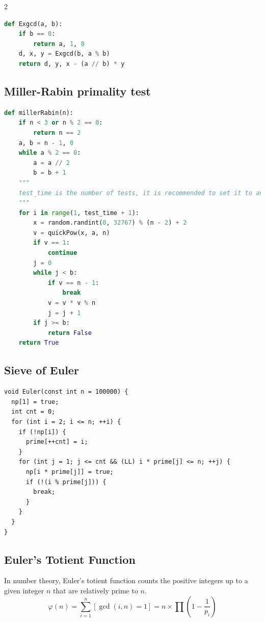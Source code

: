 \documentclass[9pt,landscape]{article}
\begin{document}
\begin{multicols}{2}
\begin{lstlisting}[language=python]
def Exgcd(a, b):
    if b == 0:
        return a, 1, 0
    d, x, y = Exgcd(b, a % b)
    return d, y, x - (a // b) * y
\end{lstlisting}

\subsection{Miller-Rabin primality test}

\begin{lstlisting}[language=python]
def millerRabin(n):
    if n < 3 or n % 2 == 0:
        return n == 2
    a, b = n - 1, 0
    while a % 2 == 0:
        a = a // 2
        b = b + 1
    """
    test_time is the number of tests, it is recommended to set it to an integer not less than 8 to ensure the correct rate, but it should not be too large, otherwise it will affect the efficiency
    """
    for i in range(1, test_time + 1):
        x = random.randint(0, 32767) % (n - 2) + 2
        v = quickPow(x, a, n)
        if v == 1:
            continue
        j = 0
        while j < b:
            if v == n - 1:
                break
            v = v * v % n
            j = j + 1
        if j >= b:
            return False
    return True
\end{lstlisting}

\subsection{Sieve of Euler}

\begin{lstlisting}
void Euler(const int n = 100000) {
  np[1] = true;
  int cnt = 0;
  for (int i = 2; i <= n; ++i) {
    if (!np[i]) {
      prime[++cnt] = i;
    }
    for (int j = 1; j <= cnt && (LL) i * prime[j] <= n; ++j) {
      np[i * prime[j]] = true;
      if (!(i % prime[j])) {
        break;
      }
    }
  }
}
\end{lstlisting}

\subsection{Euler's Totient Function}
In number theory, Euler's totient function counts the positive integers up to a given integer $n$ that are relatively prime to $n$.
\begin{equation*}
\varphi(n)=\sum_{i=1}^{n}\left[\gcd(i,n)=1\right]=n\times\prod\left(1-\frac{1}{p_i}\right)
\end{equation*}


\end{multicols}
\end{document}
